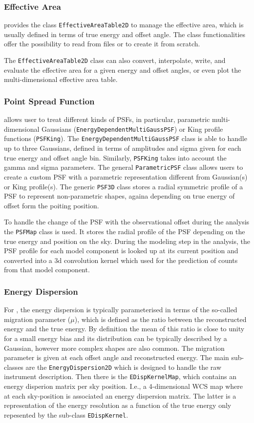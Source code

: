 \documentclass[traditabstract, longauth]{aa}
\newcommand{\code}[1]{\texttt{#1}}
\begin{document}
\subsubsection{Effective Area}
\gammapy provides the class \code{EffectiveAreaTable2D} to
manage the effective area, which is usually defined in terms of true energy and offset angle.
The class functionalities offer the possibility to read from files or to create
it from scratch. {The \code{EffectiveAreaTable2D} class can also convert, interpolate,
write, and evaluate the effective area for a given energy and offset angles, or
even plot the multi-dimensional effective area table.


\subsubsection{Point Spread Function}
\gammapy allows user to treat different kinds of PSFs,
in particular, parametric multi-dimensional Gaussians (\code{EnergyDependentMultiGaussPSF})
or King profile functions (\code{PSFKing}). The \code{EnergyDependentMultiGaussPSF}
 class is able to handle up to three
Gaussians, defined in terms of amplitudes and sigma given for each true energy
and offset angle bin. Similarly, \code{PSFKing} takes into account the gamma and
sigma parameters. The general \code{ParametricPSF} class allows users to create a
custom PSF with a parametric representation different from Gaussian(s) or King profile(s).
The generic \code{PSF3D} class stores a radial symmetric profile of a
PSF to represent non-parametric shapes, againa depending on true energy 
of offset form the poiting position.

To handle the change of the PSF with the observational offset during the analysis 
the \code{PSFMap} class is used. It stores the radial profile of the PSF
depending on the true energy and position on the sky. During the modeling
step in the analysis, the PSF profile for each model component is 
looked up at its current position and converted into a 3d convolution kernel
which used for the prediction of counts from that model component.


\subsubsection{Energy Dispersion}
For \iacts, the energy dispersion is typically parameterised in terms of the so-called
migration parameter ($\mu$), which is defined as the ratio between the
reconstructed energy and the true energy. By definition the mean of this ratio is
close to unity for a small energy bias and its distribution can 
be typically described by a Gaussian, however more complex
shapes are also common. The migration parameter is given at each offset angle and
reconstructed energy. The main sub-classes are the \code{EnergyDispersion2D} which is
designed to handle the raw instrument description. Then there is the \code{EDispKernelMap},
which contains an energy disperion matrix per sky position. I.e., a 4-dimensional WCS map
where at each sky-position is associated an energy dispersion matrix.
The latter is a representation of the energy resolution as a function of the
true energy only repesented by the sub-class \code{EDispKernel}.

}
\end{document}
